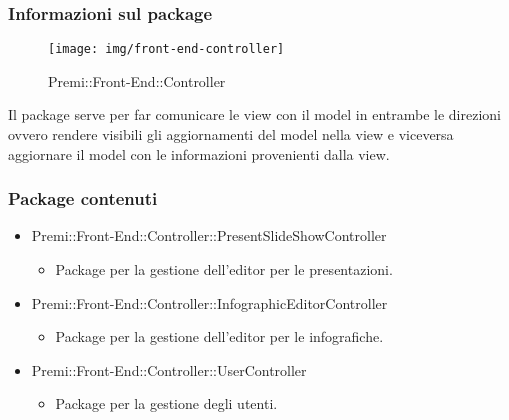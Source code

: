 \subsubsection*{Informazioni sul package}
	\begin{figure}[h]
		\centering
		\texttt{[image: img/front-end-controller]}
		\caption[Premi::Front-End::Controller]{Premi::Front-End::Controller}
	\end{figure}
	Il package serve per far comunicare le view con il model in entrambe le direzioni ovvero rendere visibili gli aggiornamenti del model nella view e viceversa aggiornare il model con le informazioni provenienti dalla view.
	\subsubsection*{Package contenuti}
		\begin{itemize}
		 \item Premi::Front-End::Controller::PresentSlideShowController
		 \begin{itemize}
		    \item Package per la gestione dell'editor per le presentazioni.
		 \end{itemize}
		 \item Premi::Front-End::Controller::InfographicEditorController
		 \begin{itemize}
		    \item Package per la gestione dell'editor per le infografiche.
		 \end{itemize}
		 \item Premi::Front-End::Controller::UserController
		 \begin{itemize}
		    \item Package per la gestione degli utenti.
		 \end{itemize}
		\end{itemize}
